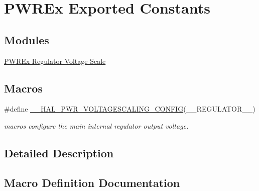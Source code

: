 \hypertarget{group___p_w_r_ex___exported___constants}{}\section{P\+W\+R\+Ex Exported Constants}
\label{group___p_w_r_ex___exported___constants}
\subsection*{Modules}
\begin{DoxyCompactItemize}
\item 
\hyperlink{group___p_w_r_ex___regulator___voltage___scale}{P\+W\+R\+Ex Regulator Voltage Scale}
\end{DoxyCompactItemize}
\subsection*{Macros}
\begin{DoxyCompactItemize}
\item 
\#define \hyperlink{group___p_w_r_ex___exported___constants_ga1ee778f7ff494723bd0ef04ec44b0f77}{\+\_\+\+\_\+\+H\+A\+L\+\_\+\+P\+W\+R\+\_\+\+V\+O\+L\+T\+A\+G\+E\+S\+C\+A\+L\+I\+N\+G\+\_\+\+C\+O\+N\+F\+IG}(\+\_\+\+\_\+\+R\+E\+G\+U\+L\+A\+T\+O\+R\+\_\+\+\_\+)
\begin{DoxyCompactList}\small\item\em macros configure the main internal regulator output voltage. \end{DoxyCompactList}\end{DoxyCompactItemize}


\subsection{Detailed Description}


\subsection{Macro Definition Documentation}
\mbox{\label{group___p_w_r_ex___exported___constants_ga1ee778f7ff494723bd0ef04ec44b0f77}} 
